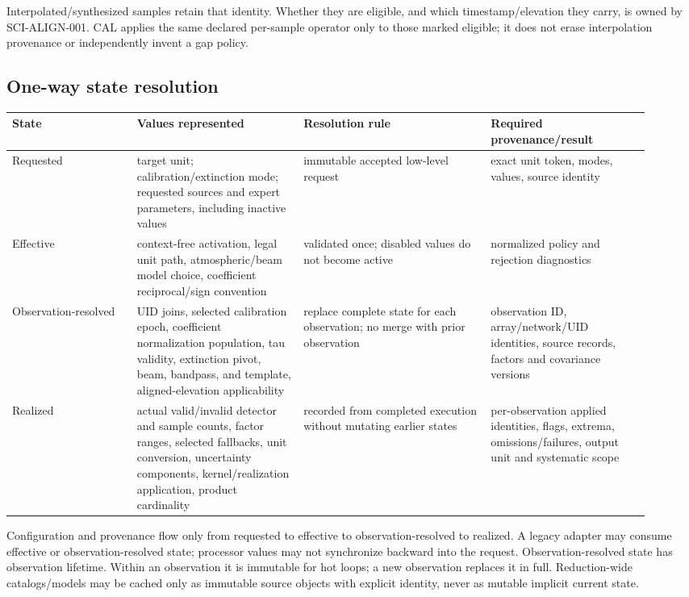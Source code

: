 \documentclass[11pt]{article}
\begin{document}
Interpolated/synthesized samples retain that identity.  Whether they are
eligible, and which timestamp/elevation they carry, is owned by SCI-ALIGN-001.
CAL applies the same declared per-sample operator only to those marked
eligible; it does not erase interpolation provenance or independently invent a
gap policy.

\subsection{One-way state resolution}

\begin{longtable}{L{0.18\linewidth}L{0.24\linewidth}L{0.27\linewidth}L{0.23\linewidth}}
\toprule
State & Values represented & Resolution rule & Required provenance/result\\
\midrule
Requested & target unit; calibration/extinction mode; requested sources and expert parameters, including inactive values & immutable accepted low-level request & exact unit token, modes, values, source identity\\
Effective & context-free activation, legal unit path, atmospheric/beam model choice, coefficient reciprocal/sign convention & validated once; disabled values do not become active & normalized policy and rejection diagnostics\\
Observation-\newline resolved & UID joins, selected calibration epoch, coefficient normalization population, tau validity, extinction pivot, beam, bandpass, and template, aligned-elevation applicability & replace complete state for each observation; no merge with prior observation & observation ID, array/network/UID identities, source records, factors and covariance versions\\
Realized & actual valid/invalid detector and sample counts, factor ranges, selected fallbacks, unit conversion, uncertainty components, kernel/realization application, product cardinality & recorded from completed execution without mutating earlier states & per-observation applied identities, flags, extrema, omissions/failures, output unit and systematic scope\\
\bottomrule
\end{longtable}

Configuration and provenance flow only from requested to effective to
observation-resolved to realized.  A legacy adapter may consume effective or
observation-resolved state; processor values may not synchronize backward into
the request.  Observation-resolved state has observation lifetime.  Within an
observation it is immutable for hot loops; a new observation replaces it in
full.  Reduction-wide catalogs/models may be cached only as immutable source
objects with explicit identity, never as mutable implicit current state.
\end{document}

